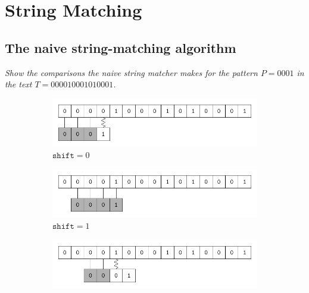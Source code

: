 \section{String Matching}

\subsection{The naive string-matching algorithm}

\begin{description}
 \textit{Show the comparisons the naive string matcher makes for the pattern $P = 0001
$ in the text $T = 000010001010001$.}

\begin{ex}
    \begin{figure}[H]
      \centering
      \begin{subfigure}[t]{.45\textwidth}
        \centering
        \includegraphics[scale=.6]{img/32_1-1/32_1-1_1.pdf}
        \caption{$\texttt{shift} = 0$}\label{fig:32_1-1_1}
      \end{subfigure}
      \begin{subfigure}[t]{.45\textwidth}
        \centering
        \includegraphics[scale=.6]{img/32_1-1/32_1-1_2.pdf}
        \caption{$\texttt{shift} = 1$}\label{fig:32_1-1_2}
      \end{subfigure}
      \begin{subfigure}[t]{.45\textwidth}
        \centering
        \includegraphics[scale=.6]{img/32_1-1/32_1-1_3.pdf}

\end{subfigure}
\end{figure}
\end{ex}
\end{description}
